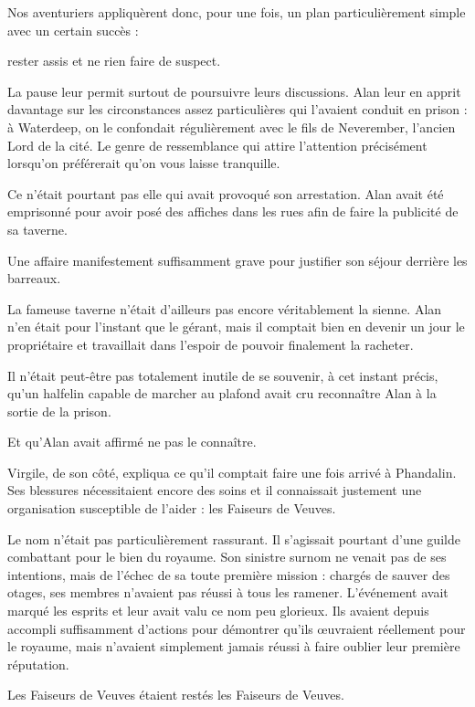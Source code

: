Nos aventuriers appliquèrent donc, pour une fois, un plan particulièrement simple avec un certain succès :

rester assis et ne rien faire de suspect.

La pause leur permit surtout de poursuivre leurs discussions. Alan leur en apprit davantage sur les circonstances assez particulières qui l'avaient conduit en prison : à Waterdeep, on le confondait régulièrement avec le fils de Neverember, l'ancien Lord de la cité. Le genre de ressemblance qui attire l'attention précisément lorsqu'on préférerait qu'on vous laisse tranquille.

Ce n'était pourtant pas elle qui avait provoqué son arrestation. Alan avait été emprisonné pour avoir posé des affiches dans les rues afin de faire la publicité de sa taverne.

Une affaire manifestement suffisamment grave pour justifier son séjour derrière les barreaux.

La fameuse taverne n'était d'ailleurs pas encore véritablement la sienne. Alan n'en était pour l'instant que le gérant, mais il comptait bien en devenir un jour le propriétaire et travaillait dans l'espoir de pouvoir finalement la racheter.

\begin{narrateur}
Il n'était peut-être pas totalement inutile de se souvenir, à cet instant précis, qu'un halfelin capable de marcher au plafond avait cru reconnaître Alan à la sortie de la prison.

Et qu'Alan avait affirmé ne pas le connaître.
\end{narrateur}

Virgile, de son côté, expliqua ce qu'il comptait faire une fois arrivé à Phandalin. Ses blessures nécessitaient encore des soins et il connaissait justement une organisation susceptible de l'aider : les Faiseurs de Veuves.

Le nom n'était pas particulièrement rassurant. Il s'agissait pourtant d'une guilde combattant pour le bien du royaume. Son sinistre surnom ne venait pas de ses intentions, mais de l'échec de sa toute première mission : chargés de sauver des otages, ses membres n'avaient pas réussi à tous les ramener. L'événement avait marqué les esprits et leur avait valu ce nom peu glorieux. Ils avaient depuis accompli suffisamment d'actions pour démontrer qu'ils œuvraient réellement pour le royaume, mais n'avaient simplement jamais réussi à faire oublier leur première réputation.

Les Faiseurs de Veuves étaient restés les Faiseurs de Veuves.

